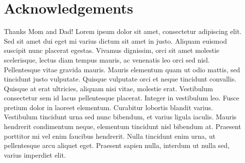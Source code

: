 \section*{Acknowledgements}

\normalsize            
Thanks Mom and Dad! Lorem ipsum dolor sit amet, consectetur adipiscing elit. Sed sit amet dui eget mi varius dictum sit amet in justo. Aliquam euismod suscipit nunc placerat egestas. Vivamus dignissim, orci sit amet molestie scelerisque, lectus diam tempus mauris, ac venenatis leo orci sed nisl. Pellentesque vitae gravida mauris. Mauris elementum quam ut odio mattis, sed tincidunt justo vulputate. Quisque vulputate orci et neque tincidunt convallis. Quisque at erat ultricies, aliquam nisi vitae, molestie erat. Vestibulum consectetur sem id lacus pellentesque placerat. Integer in vestibulum leo. Fusce pretium dolor in laoreet elementum. Curabitur lobortis blandit varius. Vestibulum tincidunt urna sed nunc bibendum, et varius ligula iaculis. Mauris hendrerit condimentum neque, elementum tincidunt nisl bibendum at. Praesent porttitor mi vel enim faucibus hendrerit. Nulla tincidunt enim urna, ut pellentesque arcu aliquet eget. Praesent sapien nulla, interdum ut nulla sed, varius imperdiet elit.

\newpage